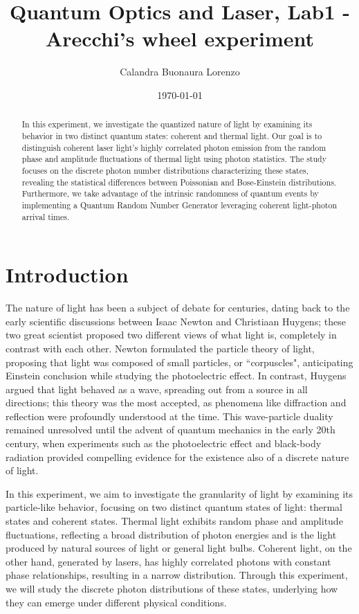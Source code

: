 \documentclass[prl,twocolumn]{revtex4-1}
\begin{document}
\title{Quantum Optics and Laser, Lab1 - Arecchi's wheel experiment}



\author{Calandra Buonaura Lorenzo}

\date{\today}


\begin{abstract}
In this experiment, we investigate the quantized nature of light by examining its behavior in two distinct quantum states: coherent and thermal light. Our goal is to distinguish coherent laser light's highly correlated photon emission from the random phase and amplitude fluctuations of thermal light using photon statistics.  The study focuses on the discrete photon number distributions characterizing these states, revealing the statistical differences between Poissonian and Bose-Einstein distributions. Furthermore, we take advantage of the intrinsic randomness of quantum events by implementing a Quantum Random Number Generator leveraging coherent light-photon arrival times.
\end{abstract}

\maketitle

\section{Introduction}
The nature of light has been a subject of debate for centuries, dating back to the early scientific discussions between Isaac Newton and Christiaan Huygens; these two great scientist proposed two different views of what light is, completely in contrast with each other. Newton formulated the particle theory of light, proposing that light was composed of small particles, or ``corpuscles", anticipating Einstein conclusion while studying the photoelectric effect. In contrast, Huygens argued that light behaved as a wave, spreading out from a source in all directions; this theory was the most accepted, as phenomena like diffraction and reflection were profoundly understood at the time. This wave-particle duality remained unresolved until the advent of quantum mechanics in the early 20th century, when experiments such as the photoelectric effect and black-body radiation provided compelling evidence for the existence also of a discrete nature of light.

In this experiment, we aim to investigate the granularity of light by examining its particle-like behavior, focusing on two distinct quantum states of light: thermal states and coherent states. Thermal light exhibits random phase and amplitude fluctuations, reflecting a broad distribution of photon energies and is the light produced by natural sources of light or general light bulbs. Coherent light, on the other hand, generated by lasers, has highly correlated photons with constant phase relationships, resulting in a narrow distribution. Through this experiment, we will study the discrete photon distributions of these states, underlying how they can emerge under different physical conditions.
\end{document}
